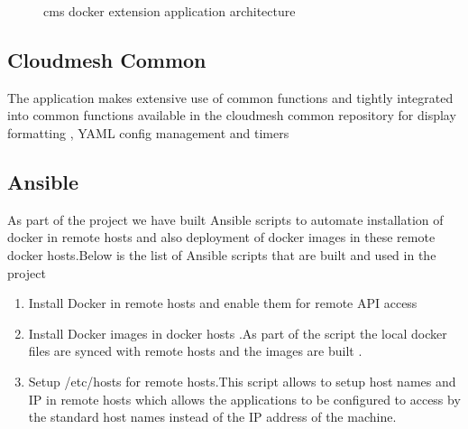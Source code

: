 \documentclass[9pt,twocolumn,twoside]{../../styles/osajnl}
\begin{document}
\begin{figure}[htbp]
\centering
{}
\caption{cms docker extension application architecture}
\label{fig:Arch}
\end{figure}

\subsection{Cloudmesh Common}

The application makes extensive use of common functions and tightly integrated into common functions available in the cloudmesh common repository for display formatting , YAML config management and timers

\subsection{Ansible}

As part of the project we have built Ansible\cite{www-Ansible} scripts to automate installation of docker in remote hosts and also deployment of docker images in these remote docker hosts.Below is the list of Ansible scripts that are built and used in the project 
\begin{enumerate}
\item Install Docker in remote hosts and enable them for remote API access
\item Install Docker images in docker hosts .As part of the script the local docker files are synced with remote hosts and the images are built .
\item Setup /etc/hosts for remote hosts.This script allows to setup host names and IP in remote hosts which allows the applications to be configured to access by the standard host names instead of the IP address of the machine.
\end{enumerate}
\end{document}
